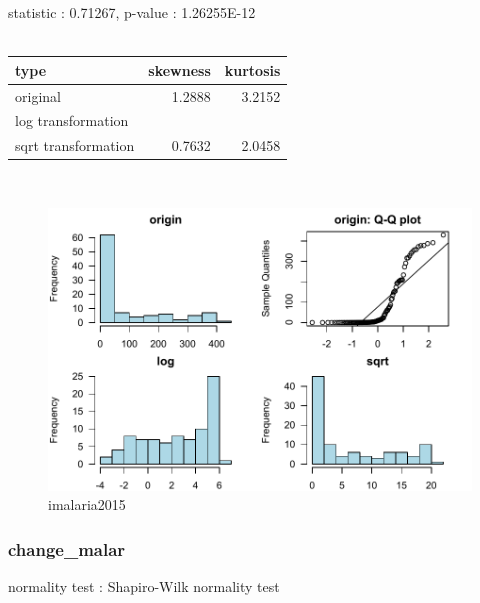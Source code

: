 \documentclass{book}\usepackage[]{graphicx}\usepackage[]{color}
\begin{document}
\noindent statistic : 0.71267,  p-value : 1.26255E-12\\
\\%
\begin{tabular}{lrr}
  \toprule
type & skewness & kurtosis \\ 
  \midrule
original & 1.2888 & 3.2152 \\ 
  log transformation &  &  \\ 
  sqrt transformation & 0.7632 & 2.0458 \\ 
   \bottomrule
\end{tabular}
\\
\begin{figure}[!ht]
\centering
\includegraphics[width=1.0\textwidth]{figure/norm6.pdf}
\caption{imalaria2015}
\end{figure}
\clearpage
\subsubsection{ change\_malar }

normality test : Shapiro-Wilk normality test
\end{document}
